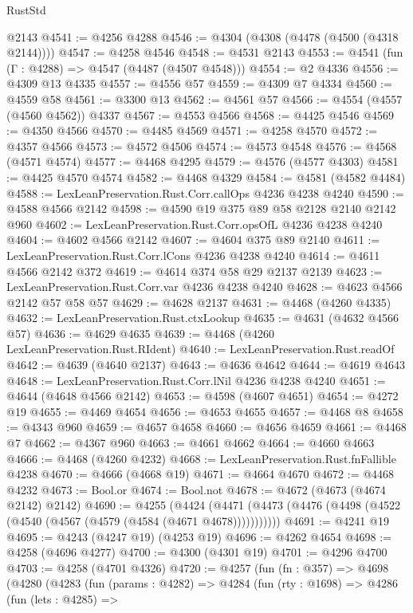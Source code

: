 \begin{lexlean}{RustStd}
\begin{coremodule}
    @2143
@4541 := @4256 @4288
@4546 := @4304 (@4308 (@4478 (@4500 (@4318 @2144))))
@4547 := @4258 @4546
@4548 := @4531 @2143
@4553 := @4541 (fun (Γ : @4288) => @4547 (@4487 (@4507 @4548)))
@4554 := @2 @4336
@4556 := @4309 @13 @4335
@4557 := @4556 @57
@4559 := @4309 @7 @4334
@4560 := @4559 @58
@4561 := @3300 @13
@4562 := @4561 @57
@4566 := @4554 (@4557 (@4560 @4562)) @4337
@4567 := @4553 @4566
@4568 := @4425 @4546
@4569 := @4350 @4566
@4570 := @4485 @4569
@4571 := @4258 @4570
@4572 := @4357 @4566
@4573 := @4572 @4506
@4574 := @4573 @4548
@4576 := @4568 (@4571 @4574)
@4577 := @4468 @4295
@4579 := @4576 (@4577 @4303)
@4581 := @4425 @4570 @4574
@4582 := @4468 @4329
@4584 := @4581 (@4582 @4484)
@4588 := LexLeanPreservation.Rust.Corr.callOps @4236 @4238 @4240
@4590 := @4588 @4566 @2142
@4598 := @4590 @19 @375 @89 @58 @2128 @2140 @2142 @960
@4602 := LexLeanPreservation.Rust.Corr.opsOfL @4236 @4238 @4240
@4604 := @4602 @4566 @2142
@4607 := @4604 @375 @89 @2140
@4611 := LexLeanPreservation.Rust.Corr.lCons @4236 @4238 @4240
@4614 := @4611 @4566 @2142 @372
@4619 := @4614 @374 @58 @29 @2137 @2139
@4623 := LexLeanPreservation.Rust.Corr.var @4236 @4238 @4240
@4628 := @4623 @4566 @2142 @57 @58 @57
@4629 := @4628 @2137
@4631 := @4468 (@4260 @4335)
@4632 := LexLeanPreservation.Rust.ctxLookup
@4635 := @4631 (@4632 @4566 @57)
@4636 := @4629 @4635
@4639 := @4468 (@4260 LexLeanPreservation.Rust.RIdent)
@4640 := LexLeanPreservation.Rust.readOf
@4642 := @4639 (@4640 @2137)
@4643 := @4636 @4642
@4644 := @4619 @4643
@4648 := LexLeanPreservation.Rust.Corr.lNil @4236 @4238 @4240
@4651 := @4644 (@4648 @4566 @2142)
@4653 := @4598 (@4607 @4651)
@4654 := @4272 @19
@4655 := @4469 @4654
@4656 := @4653 @4655
@4657 := @4468 @8
@4658 := @4343 @960
@4659 := @4657 @4658
@4660 := @4656 @4659
@4661 := @4468 @7
@4662 := @4367 @960
@4663 := @4661 @4662
@4664 := @4660 @4663
@4666 := @4468 (@4260 @4232)
@4668 := LexLeanPreservation.Rust.fnFallible @4238
@4670 := @4666 (@4668 @19)
@4671 := @4664 @4670
@4672 := @4468 @4232
@4673 := Bool.or
@4674 := Bool.not
@4678 := @4672 (@4673 (@4674 @2142) @2142)
@4690 := @4255
    (@4424 (@4471 (@4473 (@4476 (@4498 (@4522 (@4540 (@4567 (@4579 (@4584 (@4671 @4678)))))))))))
@4691 := @4241 @19
@4695 := @4243 (@4247 @19) (@4253 @19)
@4696 := @4262 @4654
@4698 := @4258 (@4696 @4277)
@4700 := @4300 (@4301 @19)
@4701 := @4296 @4700
@4703 := @4258 (@4701 @4326)
@4720 := @4257
    (fun (fn : @357) =>
    @4698
      (@4280
        (@4283
          (fun (params : @4282) =>
          @4284
            (fun (rty : @1698) =>
            @4286
              (fun (lets : @4285) =>

\end{coremodule}
\end{lexlean}
